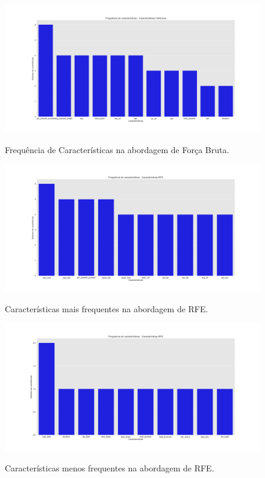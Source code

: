 \begin{figure}[h]
\caption{Frequência de Características na abordagem de Força Bruta.}
\centering
\includegraphics[scale=0.30]{figs/CaracteristicasMetodo1.png}
\label{r.graf3}
\end{figure}

\begin{figure}[h]
\caption{Características mais frequentes na abordagem de RFE.}
\centering
\includegraphics[scale=0.30]{figs/CaracteristicasMetodo2.png}
\label{r.graf4}
\end{figure}

\begin{figure}[h]
\caption{Características menos frequentes na abordagem de RFE.}
\centering
\includegraphics[scale=0.30]{figs/CaracteristicasMetodo2-menos.png}
\label{r.graf5}
\end{figure}

